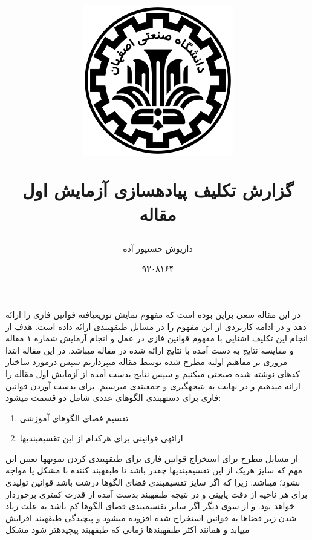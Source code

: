 \documentclass[10pt,a4paper]{article}
\newcommand{\نیمفاصله}{\halfspace}
\renewcommand{\ }{\halfspace}
\begin{document}
\title{
\begin{figure}[H]
    \centering
    \includegraphics[width=.2\textwidth]{iut}
\end{figure}
گزارش تکلیف پیاده\ سازی آزمایش اول مقاله\\
}
\author{داریوش حسن\ پور آده}
\date{۹۳۰۸۱۶۴}
\maketitle
\null
\vfill
\thispagestyle{empty}
\setcounter{page}{0}
\newpage
{}
در این مقاله\
\cite{THEPAPER}
سعی براین بوده است که مفهوم نمایش توزیع\ یافته قوانین فازی را ارائه دهد و در ادامه کاربردی از این مفهوم را در مسایل طبقه\ بندی ارائه داده است. هدف از انجام این تکلیف اشنایی با مفهوم قوانین فازی در عمل و انجام آزمایش شماره ۱ مقاله و مقایسه نتایج به دست آمده با نتایج ارائه شده در مقاله می\ باشد. در این مقاله ابتدا مروری بر مفاهیم اولیه مطرح شده توسط مقاله می\ پردازیم سپس درمورد ساختار کدهای نوشته شده صبحتی می\ کنیم و سپس نتایج بدست آمده از آزمایش اول مقاله را ارائه می\ دهیم و در نهایت به نتیجه\ گیری و جمع\ بندی می\ رسیم.
\tableofcontents
\newpage
{}
برای بدست آوردن قوانین فازی برای دستهی الگوهای عددی شامل دو قسمت می\ شود:\بند
\vspace{0em}
\begin{enumerate}[nolistsep]
    \setlength{\itemindent}{4em}
    \item تقسیم فضای الگوهای آموزشی
    \item ارائه\ ی قوانینی برای هرکدام از این تقسیم\ بندی\ ها
\end{enumerate}
از مسایل مطرح برای استخراج قوانین فازی برای طبقه\ بندی کردن نمونه\ ها تعیین این مهم که سایز هریک از این تقسیم\ بندی\ ها چقدر باشد تا طبقه\ بند کننده با مشکل
\lr{Overfitting} یا \lr{Underfitting}
مواجه نشود؛ می\ باشد. زیرا که اگر سایز تقسیم\ بندی فضای الگوها درشت باشد قوانین تولیدی برای هر ناحیه از دقت پایینی و در نتیجه طبقه\ بند بدست آمده از قدرت کمتری برخوردار خواهد بود. و از سوی دیگر اگر سایز تقسیم\ بندی فضای الگوها کم باشد به علت زیاد شدن زیر-فضاها\
به قوانین استخراج شده افزوده می\ شود و پیچیدگی طبقه\ بند افزایش می\ یابد و همانند اکثر طبقه\ بندها زمانی که طبقه\ بند پیچیده\ تر شود مشکل
\end{document}
